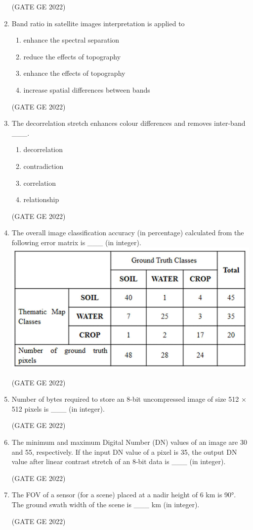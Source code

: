 \documentclass[journal,12pt,onecolumn]{IEEEtran}
\theoremstyle{remark}
\begin{document}
\begin{enumerate}
\hfill (GATE GE 2022)

\item Band ratio in satellite images interpretation is applied to
\begin{enumerate}
    \item enhance the spectral separation
    \item reduce the effects of topography
    \item enhance the effects of topography
    \item increase spatial differences between bands
\end{enumerate}

\hfill (GATE GE 2022)

\item The decorrelation stretch enhances colour differences and removes inter-band \_\_\_.
\begin{enumerate}
    \item decorrelation
    \item contradiction
    \item correlation
    \item relationship
\end{enumerate}

\hfill (GATE GE 2022)

\item The overall image classification accuracy (in percentage) calculated from the following error matrix is \_\_\_ (in integer).
\centering \includegraphics[width=\columnwidth]{figs/fig_81.png}

\hfill (GATE GE 2022)

\item Number of bytes required to store an 8-bit uncompressed image of size 512 × 512 pixels is \_\_\_ (in integer).

\hfill (GATE GE 2022)

\item The minimum and maximum Digital Number (DN) values of an image are 30 and 55, respectively. If the input DN value of a pixel is 35, the output DN value after linear contrast stretch of an 8-bit data is \_\_\_ (in integer).

\hfill (GATE GE 2022)

\item The FOV of a sensor (for a scene) placed at a nadir height of 6 km is 90°. The ground swath width of the scene is \_\_\_ km (in integer).

\hfill (GATE GE 2022)

\end{enumerate}
\end{document}
